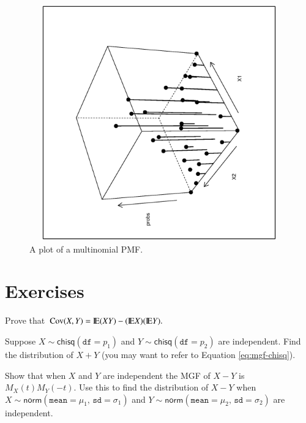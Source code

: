 \documentclass[captions=tableheading]{scrbook}
\begin{document}
\begin{figure}[th]
  \includegraphics[width=5in, height=4in]{ps/multinom-pmf2.ps}
  \caption[Plot of a multinomial PMF.]{\small A plot of a multinomial PMF.}
    \label{fig:multinom-pmf2}
\end{figure}


\newpage{}
\section{Exercises}
\label{sec-7-10}


\setcounter{thm}{0}

\begin{xca}
Prove that \( \mbox{Cov}(X,Y)=\mathrm{I\hspace{-1.5pt}E}(XY)-(\mathrm{I\hspace{-1.5pt}E} X)(\mathrm{I\hspace{-1.5pt}E} Y). \) \label{xca:Prove-cov-shortcut}
\end{xca}

\begin{xca}
\label{xca:sum-indep-chisq}
Suppose \(X\sim\mathsf{chisq}(\mathtt{df}=p_{1})\) and \(Y\sim\mathsf{chisq}(\mathtt{df}=p_{2})\) are independent. Find the distribution of \(X+Y\) (you may want to refer to Equation \ref{eq:mgf-chisq}).
\end{xca}

\begin{xca}
\label{xca:diff-indep-norm}
Show that when \(X\) and \(Y\) are independent the MGF of \(X-Y\) is \(M_{X}(t)M_{Y}(-t)\). Use this to find the distribution of \(X-Y\) when \(X\sim\mathsf{norm}(\mathtt{mean}=\mu_{1},\,\mathtt{sd}=\sigma_{1})\) and \(Y\sim\mathsf{norm}(\mathtt{mean}=\mu_{2},\,\mathtt{sd}=\sigma_{2})\)  are independent. 
\end{xca}
\end{document}
